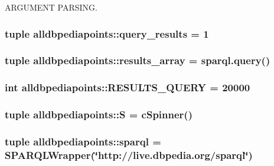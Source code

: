\-A\-R\-G\-U\-M\-E\-N\-T \-P\-A\-R\-S\-I\-N\-G. 

\hypertarget{namespacealldbpediapoints_a68f0d6010ae0d06cda635211083677a5}{
\subsubsection[{query\-\_\-results}]{\setlength{\rightskip}{0pt plus 5cm}tuple {\bf alldbpediapoints\-::query\-\_\-results} = 1}}\label{namespacealldbpediapoints_a68f0d6010ae0d06cda635211083677a5}
\hypertarget{namespacealldbpediapoints_a806e39dd7996f0e6701f925654922fc9}{
\subsubsection[{results\-\_\-array}]{\setlength{\rightskip}{0pt plus 5cm}tuple {\bf alldbpediapoints\-::results\-\_\-array} = sparql.\-query()}}\label{namespacealldbpediapoints_a806e39dd7996f0e6701f925654922fc9}
\hypertarget{namespacealldbpediapoints_aa84c23bff204551129efc030239a1d30}{
\subsubsection[{\-R\-E\-S\-U\-L\-T\-S\-\_\-\-Q\-U\-E\-R\-Y}]{\setlength{\rightskip}{0pt plus 5cm}int {\bf alldbpediapoints\-::\-R\-E\-S\-U\-L\-T\-S\-\_\-\-Q\-U\-E\-R\-Y} = 20000}}\label{namespacealldbpediapoints_aa84c23bff204551129efc030239a1d30}
\hypertarget{namespacealldbpediapoints_ac1f9f39e29a7aedbcc64e9538f476a72}{
\subsubsection[{\-S}]{\setlength{\rightskip}{0pt plus 5cm}tuple {\bf alldbpediapoints\-::\-S} = {\bf c\-Spinner}()}}\label{namespacealldbpediapoints_ac1f9f39e29a7aedbcc64e9538f476a72}
\hypertarget{namespacealldbpediapoints_a7a4fa8530ce9061fe014924a1676e73d}{
\subsubsection[{sparql}]{\setlength{\rightskip}{0pt plus 5cm}tuple {\bf alldbpediapoints\-::sparql} = \-S\-P\-A\-R\-Q\-L\-Wrapper(\char`\"{}http\-://live.\-dbpedia.\-org/{\bf sparql}\char`\"{})}}\label{namespacealldbpediapoints_a7a4fa8530ce9061fe014924a1676e73d}
